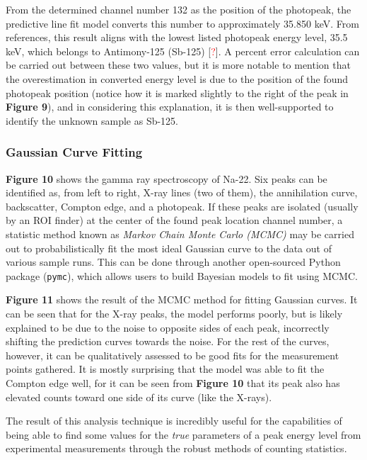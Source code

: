 \documentclass[12pt]{article}
\begin{document}
\begin{multicols}{2}
From the determined channel number 132 as the position of the photopeak,
the predictive line fit model converts this number to approximately 35.850 keV.
From references, this result aligns with the lowest listed photopeak energy level,
35.5 keV, which belongs to Antimony-125 (Sb-125) [\textcolor{red}{?}].
A percent error calculation can be carried out between these two values,
but it is more notable to mention that the overestimation in converted energy level
is due to the position of the found photopeak position (notice how it is marked
slightly to the right of the peak in \textbf{Figure 9}), and in considering this
explanation, it is then well-supported to identify the unknown sample as Sb-125.

\subsubsection{Gaussian Curve Fitting}
\textbf{Figure 10} shows the gamma ray spectroscopy of Na-22.
Six peaks can be identified as, from left to right, X-ray lines (two of them),
the annihilation curve, backscatter, Compton edge, and a photopeak. 
If these peaks are isolated (usually by an ROI finder) at the center of the
found peak location channel number, a statistic method known as \textit{Markov
Chain Monte Carlo (MCMC)} may be carried out to probabilistically fit the most
ideal Gaussian curve to the data out of various sample runs. This can be done through
another open-sourced Python package (\texttt{pymc}), which allows users to build
Bayesian models to fit using MCMC.

\textbf{Figure 11} shows the result of the MCMC method for fitting Gaussian curves.
It can be seen that for the X-ray peaks, the model performs poorly, but is likely
explained to be due to the noise to opposite sides of each peak, incorrectly
shifting the prediction curves towards the noise. For the rest of the curves, however,
it can be qualitatively assessed to be good fits for the measurement points gathered.
It is mostly surprising that the model was able to fit the Compton edge well,
for it can be seen from \textbf{Figure 10} that its peak also has elevated counts
toward one side of its curve (like the X-rays).

The result of this analysis technique is incredibly useful for the capabilities of
being able to find some values for the \textit{true} parameters of a peak energy level
from experimental measurements through the robust methods of counting statistics.
\newpage

\end{multicols}
\end{document}
